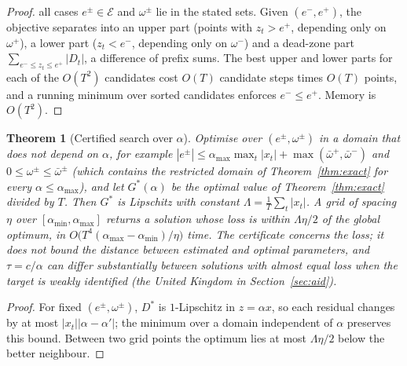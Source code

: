 \documentclass[pdflatex,sn-basic]{sn-jnl}
\theoremstyle{thmstyleone}\newtheorem{proposition}{Proposition}\newtheorem{theorem}{Theorem}
\theoremstyle{thmstylethree}\newtheorem{remark}{Remark}
\begin{document}
\begin{proof}
all cases $e^\pm\in\mathcal{E}$ and $\omega^\pm$ lie in the stated sets. Given $(e^-,e^+)$, the objective separates into an upper part (points with $z_t>e^+$, depending only on $\omega^+$), a lower part ($z_t<e^-$, depending only on $\omega^-$) and a dead-zone part $\sum_{e^-\le z_t\le e^+}|D_t|$, a difference of prefix sums. The best upper and lower parts for each of the $O(T^2)$ candidates cost $O(T)$ candidate steps times $O(T)$ points, and a running minimum over sorted candidates enforces $e^-\le e^+$. Memory is $O(T^2)$.
\end{proof}

\begin{theorem}[Certified search over $\alpha$]\label{thm:lip}
Optimise over $(e^\pm,\omega^\pm)$ in a domain that does not depend on $\alpha$, for example $|e^\pm|\le\alpha_{\max}\max_t|x_t|+\max(\bar\omega^+,\bar\omega^-)$ and $0\le\omega^\pm\le\bar\omega^\pm$ (which contains the restricted domain of Theorem~\ref{thm:exact} for every $\alpha\le\alpha_{\max}$), and let $G^*(\alpha)$ be the optimal value of Theorem~\ref{thm:exact} divided by $T$. Then $G^*$ is Lipschitz with constant $\Lambda=\frac1T\sum_t|x_t|$. A grid of spacing $\eta$ over $[\alpha_{\min},\alpha_{\max}]$ returns a solution whose loss is within $\Lambda\eta/2$ of the global optimum, in $O\big(T^4(\alpha_{\max}-\alpha_{\min})/\eta\big)$ time. The certificate concerns the loss; it does not bound the distance between estimated and optimal parameters, and $\tau=c/\alpha$ can differ substantially between solutions with almost equal loss when the target is weakly identified (the United Kingdom in Section~\ref{sec:aid}).
\end{theorem}
\begin{proof}
For fixed $(e^\pm,\omega^\pm)$, $D^*$ is $1$-Lipschitz in $z=\alpha x$, so each residual changes by at most $|x_t||\alpha-\alpha'|$; the minimum over a domain independent of $\alpha$ preserves this bound. Between two grid points the optimum lies at most $\Lambda\eta/2$ below the better neighbour.
\end{proof}
\end{document}

